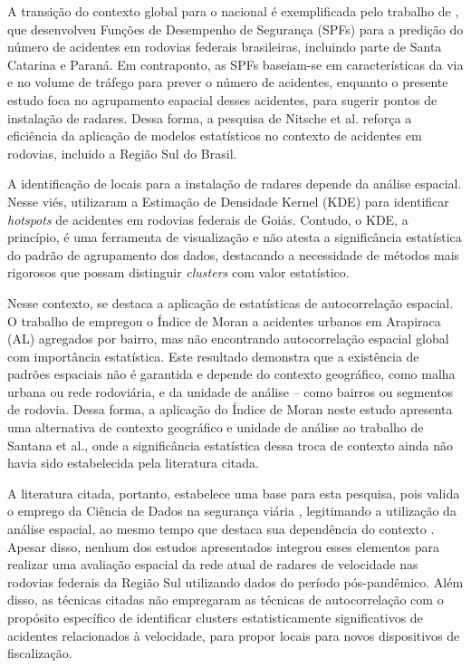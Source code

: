 \documentclass[12pt]{article}
\begin{document}
A transição do contexto global para o nacional é exemplificada pelo trabalho de \cite{nitsche2022}, que desenvolveu Funções de Desempenho de Segurança (SPFs) para a predição do número de acidentes em rodovias federais brasileiras, incluindo parte de Santa Catarina e Paraná. 
Em contraponto, as SPFs baseiam-se em características da via e no volume de tráfego para prever o número de acidentes, enquanto o presente estudo foca no agrupamento eapacial desses acidentes, para sugerir pontos de instalação de radares.
Dessa forma, a pesquisa de Nitsche et al. reforça a eficiência da aplicação de modelos estatísticos no contexto de acidentes em rodovias, incluido a Região Sul do Brasil.

A identificação de locais para a instalação de radares depende da análise espacial. Nesse viés, \cite{santos2020} utilizaram a Estimação de Densidade Kernel (KDE) para identificar \textit{hotspots} de acidentes em rodovias federais de Goiás.
Contudo, o KDE, a princípio, é uma ferramenta de visualização e não atesta a significância estatística do padrão de agrupamento dos dados, destacando a necessidade de métodos mais rigorosos que possam distinguir \textit{clusters} com valor estatístico.

Nesse contexto, se destaca a aplicação de estatísticas de autocorrelação espacial. O trabalho de \cite{santana2024} empregou o Índice de Moran a acidentes urbanos em Arapiraca (AL) agregados por bairro, mas não encontrando autocorrelação espacial global com importância estatística. 
Este resultado demonstra que a existência de padrões espaciais não é garantida e depende do contexto geográfico, como malha urbana ou rede rodoviária, e da unidade de análise -- como bairros ou segmentos de rodovia. 
Dessa forma, a aplicação do Índice de Moran neste estudo apresenta uma alternativa de contexto geográfico e unidade de análise ao trabalho de  Santana et al., onde a significância estatística dessa troca de contexto ainda não havia sido estabelecida pela literatura citada.

A literatura citada, portanto, estabelece uma base para esta pesquisa, pois valida o emprego da Ciência de Dados na segurança viária 
\cite{deona2021, nitsche2022}, legitimando a utilização da análise espacial, ao mesmo tempo que destaca sua dependência do contexto \cite{santos2020, santana2024}.
Apesar disso, nenhum dos estudos apresentados integrou esses elementos para realizar uma avaliação espacial da rede atual de radares de velocidade nas rodovias federais da Região Sul utilizando dados do período pós-pandêmico. 
Além disso, as técnicas citadas não empregaram as técnicas de autocorrelação com o propósito específico de identificar clusters estatisticamente significativos de acidentes relacionados à velocidade, para propor locais para novos dispositivos de fiscalização.
\end{document}
